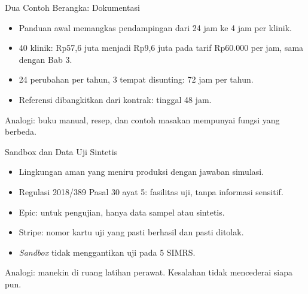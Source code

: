 \documentclass[aspectratio=169, table, 12pt]{beamer}
\begin{document}
\begin{frame}{{\Large Dua Contoh Berangka: Dokumentasi}}
  \vspace{8pt}
  \begin{itemize}
    \item Panduan awal memangkas pendampingan dari 24 jam ke 4 jam per klinik.
    \item 40 klinik: Rp57,6 juta menjadi Rp9,6 juta pada tarif Rp60.000 per jam, sama dengan Bab 3.
    \item 24 perubahan per tahun, 3 tempat disunting: 72 jam per tahun.
    \item Referensi dibangkitkan dari kontrak: tinggal 48 jam.
  \end{itemize}
  \vspace{6pt}
  {\small Analogi: buku manual, resep, dan contoh masakan mempunyai fungsi yang berbeda.}
\end{frame}

\begin{frame}{{\Large Sandbox dan Data Uji Sintetis}}
  \vspace{8pt}
  \begin{itemize}
    \item Lingkungan aman yang meniru produksi dengan jawaban simulasi.
    \item Regulasi 2018/389 Pasal 30 ayat 5: fasilitas uji, tanpa informasi sensitif.
    \item Epic: untuk pengujian, hanya data sampel atau sintetis.
    \item Stripe: nomor kartu uji yang pasti berhasil dan pasti ditolak.
    \item \textit{Sandbox} tidak menggantikan uji pada 5 SIMRS.
  \end{itemize}
  \vspace{6pt}
  {\small Analogi: manekin di ruang latihan perawat. Kesalahan tidak mencederai siapa pun.}
\end{frame}
\end{document}
